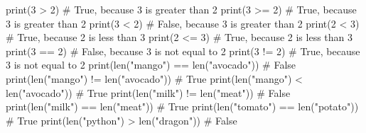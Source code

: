 \documentclass[
  letterpaper,
  krantz2]{{[}./krantz{]}}
\newenvironment{Shaded}{\begin{snugshade}}{\end{snugshade}}
\newcommand{\BuiltInTok}[1]{\textcolor[rgb]{0.00,0.23,0.31}{#1}}
\newcommand{\CommentTok}[1]{\textcolor[rgb]{0.37,0.37,0.37}{#1}}
\newcommand{\DecValTok}[1]{\textcolor[rgb]{0.68,0.00,0.00}{#1}}
\newcommand{\NormalTok}[1]{\textcolor[rgb]{0.00,0.23,0.31}{#1}}
\newcommand{\OperatorTok}[1]{\textcolor[rgb]{0.37,0.37,0.37}{#1}}
\newcommand{\StringTok}[1]{\textcolor[rgb]{0.13,0.47,0.30}{#1}}
\begin{document}
\begin{Shaded}
\begin{Highlighting}[]
\BuiltInTok{print}\NormalTok{(}\DecValTok{3} \OperatorTok{\textgreater{}} \DecValTok{2}\NormalTok{)  }\CommentTok{\# True, because 3 is greater than 2}
\BuiltInTok{print}\NormalTok{(}\DecValTok{3} \OperatorTok{\textgreater{}=} \DecValTok{2}\NormalTok{)  }\CommentTok{\# True, because 3 is greater than 2}
\BuiltInTok{print}\NormalTok{(}\DecValTok{3} \OperatorTok{\textless{}} \DecValTok{2}\NormalTok{)  }\CommentTok{\# False,  because 3 is greater than 2}
\BuiltInTok{print}\NormalTok{(}\DecValTok{2} \OperatorTok{\textless{}} \DecValTok{3}\NormalTok{)  }\CommentTok{\# True, because 2 is less than 3}
\BuiltInTok{print}\NormalTok{(}\DecValTok{2} \OperatorTok{\textless{}=} \DecValTok{3}\NormalTok{)  }\CommentTok{\# True, because 2 is less than 3}
\BuiltInTok{print}\NormalTok{(}\DecValTok{3} \OperatorTok{==} \DecValTok{2}\NormalTok{)  }\CommentTok{\# False, because 3 is not equal to 2}
\BuiltInTok{print}\NormalTok{(}\DecValTok{3} \OperatorTok{!=} \DecValTok{2}\NormalTok{)  }\CommentTok{\# True, because 3 is not equal to 2}
\BuiltInTok{print}\NormalTok{(}\BuiltInTok{len}\NormalTok{(}\StringTok{"mango"}\NormalTok{) }\OperatorTok{==} \BuiltInTok{len}\NormalTok{(}\StringTok{"avocado"}\NormalTok{))  }\CommentTok{\# False}
\BuiltInTok{print}\NormalTok{(}\BuiltInTok{len}\NormalTok{(}\StringTok{"mango"}\NormalTok{) }\OperatorTok{!=} \BuiltInTok{len}\NormalTok{(}\StringTok{"avocado"}\NormalTok{))  }\CommentTok{\# True}
\BuiltInTok{print}\NormalTok{(}\BuiltInTok{len}\NormalTok{(}\StringTok{"mango"}\NormalTok{) }\OperatorTok{\textless{}} \BuiltInTok{len}\NormalTok{(}\StringTok{"avocado"}\NormalTok{))  }\CommentTok{\# True}
\BuiltInTok{print}\NormalTok{(}\BuiltInTok{len}\NormalTok{(}\StringTok{"milk"}\NormalTok{) }\OperatorTok{!=} \BuiltInTok{len}\NormalTok{(}\StringTok{"meat"}\NormalTok{))  }\CommentTok{\# False}
\BuiltInTok{print}\NormalTok{(}\BuiltInTok{len}\NormalTok{(}\StringTok{"milk"}\NormalTok{) }\OperatorTok{==} \BuiltInTok{len}\NormalTok{(}\StringTok{"meat"}\NormalTok{))  }\CommentTok{\# True}
\BuiltInTok{print}\NormalTok{(}\BuiltInTok{len}\NormalTok{(}\StringTok{"tomato"}\NormalTok{) }\OperatorTok{==} \BuiltInTok{len}\NormalTok{(}\StringTok{"potato"}\NormalTok{))  }\CommentTok{\# True}
\BuiltInTok{print}\NormalTok{(}\BuiltInTok{len}\NormalTok{(}\StringTok{"python"}\NormalTok{) }\OperatorTok{\textgreater{}} \BuiltInTok{len}\NormalTok{(}\StringTok{"dragon"}\NormalTok{))  }\CommentTok{\# False}
\end{Highlighting}
\end{Shaded}
\end{document}
